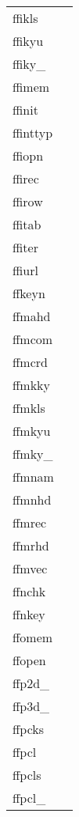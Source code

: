 \documentclass[11pt]{book}
\begin{document}
\begin{tabular}{lr}

ffikls    & \pageref{ffikyx} \\
ffikyu   & \pageref{ffikyu} \\
ffiky\_    & \pageref{ffikyx} \\
ffimem  & \pageref{ffimem} \\
ffinit  & \pageref{ffinit} \\
ffinttyp    & \pageref{ffinttyp} \\
ffiopn & \pageref{ffopen} \\
ffirec     & \pageref{ffirec} \\
ffirow  & \pageref{ffirow} \\
ffitab    & \pageref{ffitab} \\
ffiter   & \pageref{ffiter} \\
ffiurl & \pageref{ffiurl} \\
ffkeyn      & \pageref{ffkeyn} \\
ffmahd     & \pageref{ffmahd} \\
ffmcom    & \pageref{ffmcom} \\
ffmcrd       & \pageref{ffmcrd} \\
ffmkky    & \pageref{ffmkky} \\
ffmkls    & \pageref{ffmkyx} \\
ffmkyu   & \pageref{ffmkyu} \\
ffmky\_    & \pageref{ffmkyx} \\
ffmnam       & \pageref{ffmnam} \\
ffmnhd     & \pageref{ffmnhd} \\
ffmrec     & \pageref{ffmrec} \\
ffmrhd     & \pageref{ffmrhd} \\
ffmvec  & \pageref{ffmvec} \\
ffnchk  & \pageref{ffnchk} \\
ffnkey      & \pageref{ffnkey} \\
ffomem   & \pageref{ffomem} \\
ffopen      & \pageref{ffopen} \\
ffp2d\_   & \pageref{ffp2dx} \\
ffp3d\_   & \pageref{ffp3dx} \\
ffpcks   & \pageref{ffpcks} \\
ffpcl         & \pageref{ffpcl} \\
ffpcls     & \pageref{ffpcls} \\
ffpcl\_     & \pageref{ffpclx} \\

\end{tabular}
\end{document}
